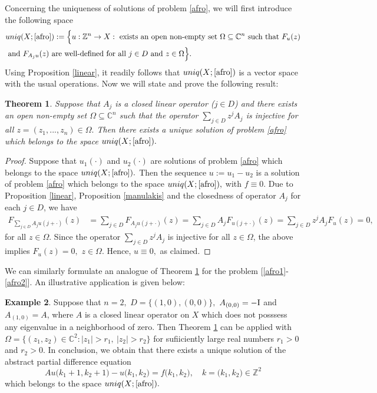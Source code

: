 \documentclass{amsart}
\newtheorem{thm}{Theorem}[section]
\theoremstyle{definition}
\newtheorem{example}[thm]{Example}
\theoremstyle{remark}
\numberwithin{equation}{section}
\begin{document}
Concerning the uniqueness of solutions of problem \eqref{afro}, we will first introduce the following space{\small
\begin{align*} &
uniq(X;\eqref{afro}):=\Bigl\{  u : {\mathbb Z}^{n} \rightarrow X : \mbox{ exists an open non-empty set }\Omega \subseteq {\mathbb C}^{n}\mbox{ such that }F_{u}(z)\\& \mbox{ and }F_{A_{j}u}(z)  \mbox{ are well-defined for all } j\in D\mbox{ and }z\in \Omega \Bigr\}.
\end{align*}}Using Proposition \ref{linear}, it readily follows that $uniq(X;\eqref{afro})$ is a vector space with the usual operations. Now we will state and prove the following result:

\begin{thm}\label{iniq}
Suppose that $A_{j}$ is a closed linear operator ($j\in D$) and there exists an open non-empty set  $\Omega \subseteq {\mathbb C}^{n}$ such that  the operator $\sum_{j\in D}z^{j}A_{j}$ is injective for all $z=(z_{1},...,z_{n})\in \Omega .$ Then there exists a unique solution of problem \eqref{afro} which belongs to the space $uniq(X;\eqref{afro}).$  
\end{thm}

\begin{proof}
Suppose that $u_{1}(\cdot)$ and $u_{2}(\cdot)$ are solutions of problem \eqref{afro} which belongs to the space $uniq(X;\eqref{afro}).$  Then the sequence $u:=u_{1}-u_{2}$ is a solution of problem \eqref{afro} which belongs to the space $uniq(X;\eqref{afro}),$ with $f\equiv 0.$ Due to Proposition \ref{linear}, Proposition \ref{manulakis} and the closedness of operator $A_{j}$ for each $j\in D$, we have
\begin{align*}
F_{\sum_{j\in D}A_{j}u(j+\cdot)}(z)&=\sum_{j\in D}F_{A_{j}u(j+\cdot)}(z)=\sum_{j\in D}A_{j}F_{u(j+\cdot)}(z)=\sum_{j\in D}z^{j}A_{j}F_{u}(z)=0, 
\end{align*}
for all $z\in \Omega$. Since the operator $\sum_{j\in D}z^{j}A_{j}$ is injective for all $z\in \Omega$, the above implies $F_{u}(z)=0,$ $z\in \Omega.$ Hence, $u\equiv 0,$ as claimed. 
\end{proof}

We can similarly formulate an analogue of Theorem \ref{iniq} for the problem [\eqref{afro1}-\eqref{afro2}]. An illustrative application  is given below:

\begin{example}\label{njas}
Suppose that $n=2,$ $D=\{(1,0),(0,0)\},$ $A_{(0,0)}=-{\rm I}$ and $A_{(1,0)}=A$, where $A$ is a closed linear operator on $X$ which does not posssess any eigenvalue in a neighborhood of zero. Then Theorem \ref{iniq} can be applied with $\Omega=\{(z_{1},z_{2}) \in {\mathbb C}^{2} : |z_{1}|>r_{1},\ |z_{2}|>r_{2}\}$ for sufiiciently large real numbers $r_{1}>0$ and $r_{2}>0$. In conclusion, we obtain that there exists a unique solution of the abstract partial difference equation
$$
Au\bigl(k_{1}+1,k_{2}+1\bigr)-u\bigl(k_{1},k_{2}\bigr)=f\bigl(k_{1},k_{2}\bigr),\quad k= \bigl(k_{1} ,k_{2} \bigr)\in {\mathbb Z}^{2}
$$
which belongs to the space $uniq(X;\eqref{afro}).$
\end{example}
\end{document}
